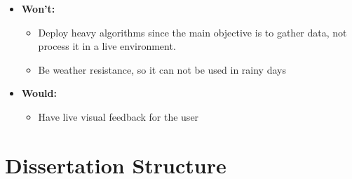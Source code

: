 \begin{itemize}
    \item \textbf{Won't:}
    \begin{itemize}
        \item Deploy heavy algorithms since the main objective is to gather data, not process it in a live environment.
        \item Be weather resistance, so it can  not be used in rainy days
    \end{itemize}
    \item \textbf{Would:}
    \begin{itemize}
        \item Have live visual feedback for the user
    \end{itemize}
\end{itemize}


\section{Dissertation Structure}